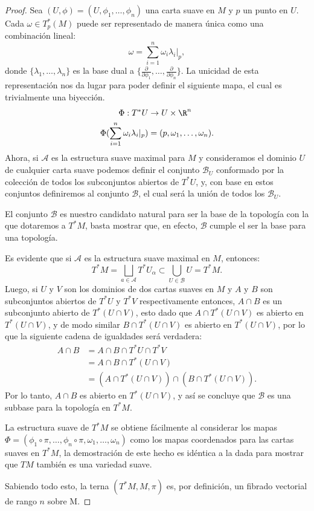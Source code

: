 \begin{proof}
	Sea $(U,\phi) = (U,\phi_1, \ldots, \phi_n)$ una carta suave en $M$ y $p$ un punto en $U$. Cada $\omega \in T_{p}^{*}(M)$ puede ser representado de manera única como una combinación lineal:
	\[
		\omega = \sum_{i=1}^{n} \omega_i \lambda_i |_p,
	\]
	donde $\{\lambda_1, \ldots, \lambda_n \}$ es la base dual a $\{\frac{\partial}{\partial \phi_1}, \ldots, \frac{\partial}{\partial \phi_n}\}$. La unicidad de esta representación nos da lugar para poder definir el siguiente mapa, el cual es trivialmente una biyección.
	\begin{align*}
		\Phi: T^*U                                   & \to U \times \R^n \\
		\Phi( \sum_{i=1}^{n} \omega_i \lambda_i |_p) & =
		(p, \omega_1, \ldots, \omega_n).
	\end{align*}
	Ahora, si $\mathcal{A}$ es la estructura suave maximal para $M$ y consideramos el dominio $U$ de cualquier carta suave podemos definir el conjunto $\mathcal{B}_U$ conformado por la colección de todos los subconjuntos abiertos de $T^{*}U$, y, con base en estos conjuntos definiremos al conjunto $\mathcal{B}$, el cual será la unión de todos los $\mathcal{B}_U$.

	El conjunto $\mathcal{B}$ es nuestro candidato natural para ser la base de la topología con la que dotaremos a $T^{*}M$, basta mostrar que, en efecto, $\mathcal{B}$ cumple el ser la base para una topología.

	Es evidente que si $\mathcal{A}$ es la estructura suave maximal en $M$, entonces:
	\[
    T^{*}M = \bigsqcup_{a \in \mathcal{A}} T^{*}U_{\alpha}
    \subset \bigcup_{U \in \mathcal{B}} U = T^*M.
	\]
	Luego, si $U$ y $V$ son los dominios de dos cartas suaves en $M$ y $A$ y $B$ son subconjuntos abiertos de $T^{*}U$ y $T^{*}V$ respectivamente entonces, $A \cap B$ es un subconjunto abierto de $T^{*}(U \cap V)$, esto dado que $A \cap T^{*}(U \cap V)$ es abierto en $T^{*}(U \cap V)$, y de modo similar $B \cap T^{*}(U \cap V)$ es abierto en $T^{*}(U \cap V)$, por lo que la siguiente cadena de igualdades será verdadera:
	\begin{align*}
		A \cap B & = A \cap B \cap T^{*}U \cap T^{*}V                       \\
		         & = A \cap B \cap T^{*}(U \cap V)                          \\
		         & = (A \cap T^{*}(U \cap V)) \cap (B \cap T^{*}(U \cap V)).
	\end{align*}
  Por lo tanto, $A \cap B$ es abierto en $T^{*}(U \cap V)$, y así se concluye que $\mathcal{B}$ es una subbase para la topología en $T^{*}M$.

  La estructura suave de $T^{*}M$ se obtiene fácilmente al considerar los mapas $\Phi = (\phi_1 \circ \pi, \ldots, \phi_n \circ \pi, \omega_1, \ldots, \omega_n)$ como los mapas coordenados para las cartas suaves en $T^{*}M$, la demostración de este hecho es idéntica a la dada para mostrar que $TM$ también es una variedad suave.

  Sabiendo todo esto, la terna $(T^{*}M, M, \pi)$ es, por definición, un fibrado vectorial de rango $n$ sobre M.
\end{proof}


